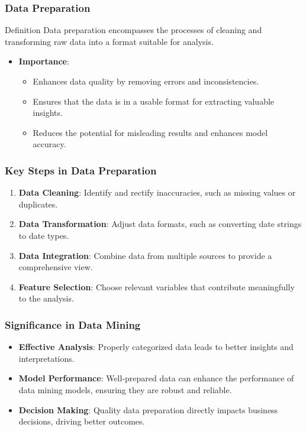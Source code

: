 \documentclass{beamer}
\begin{document}
\begin{frame}[fragile]
    \frametitle{Data Preparation}
    \begin{block}{Definition}
        Data preparation encompasses the processes of cleaning and transforming raw data into a format suitable for analysis.
    \end{block}
    \begin{itemize}
        \item \textbf{Importance}:
        \begin{itemize}
            \item Enhances data quality by removing errors and inconsistencies.
            \item Ensures that the data is in a usable format for extracting valuable insights.
            \item Reduces the potential for misleading results and enhances model accuracy.
        \end{itemize}
    \end{itemize}
\end{frame}

\begin{frame}[fragile]
    \frametitle{Key Steps in Data Preparation}
    \begin{enumerate}
        \item \textbf{Data Cleaning}: Identify and rectify inaccuracies, such as missing values or duplicates.
        \item \textbf{Data Transformation}: Adjust data formats, such as converting date strings to date types.
        \item \textbf{Data Integration}: Combine data from multiple sources to provide a comprehensive view.
        \item \textbf{Feature Selection}: Choose relevant variables that contribute meaningfully to the analysis.
    \end{enumerate}
\end{frame}

\begin{frame}[fragile]
    \frametitle{Significance in Data Mining}
    \begin{itemize}
        \item \textbf{Effective Analysis}: Properly categorized data leads to better insights and interpretations.
        \item \textbf{Model Performance}: Well-prepared data can enhance the performance of data mining models, ensuring they are robust and reliable.
        \item \textbf{Decision Making}: Quality data preparation directly impacts business decisions, driving better outcomes.
    \end{itemize}
\end{frame}
\end{document}
